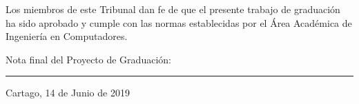 \vfill

Los miembros de este Tribunal dan fe de que el presente trabajo de graduación
ha sido aprobado y cumple con las normas establecidas por el Área Académica de Ingeniería en Computadores.

\vfill

\begin{center}
  Nota final del Proyecto de Graduación: \rule{3cm}{0.5pt}
\end{center}
\vfill

\begin{center}
  Cartago, 14 de Junio de 2019\par
\end{center}

\cleardoublepage


